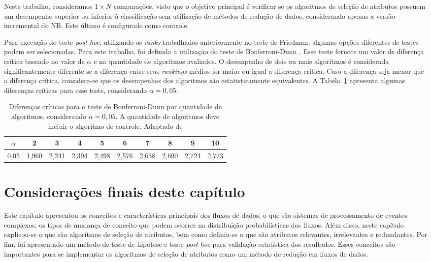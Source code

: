 Neste trabalho, consideramos $ 1 \times N $ comparações, visto que o objetivo principal é verificar se os algoritmos de seleção de atributos possuem um desempenho superior ou inferior à classificação sem utilização de métodos de redução de dados, considerando apenas a versão incremental do NB. Este último é configurado como controle.

Para execução do teste \textit{post-hoc}, utilizando os \textit{ranks} trabalhados anteriormente no teste de Friedman, algumas opções diferentes de testes podem ser selecionadas. Para este trabalho, foi definida a utilização do teste de Bonferroni-Dunn \cite{Demsar2006}. Esse teste fornece um valor de diferença crítica baseado no valor de $\alpha$ e na quantidade de algoritmos avaliados. O desempenho de dois ou mais algoritmos é considerada significantemente diferente se a diferença entre seus \textit{rankings} médios for maior ou igual a diferença crítica. Caso a diferença seja menor que a diferença crítica, considera-se que os desempenhos dos algoritmos são estatisticamente equivalentes. A Tabela~\ref{tab:bonferroni} apresenta algumas diferenças críticas para esse teste, considerando $\alpha = 0,05$.


\begin{table}[!ht]
\centering
\caption[Diferenças críticas para o teste de Bonferroni-Dunn.]{Diferenças críticas para o teste de Bonferroni-Dunn por quantidade de algoritmos, considerando $\alpha = 0,05$. A quantidade de algoritmos deve incluir o algoritmo de controle. Adaptado de }
\label{tab:bonferroni}
\begin{tabular}{cccccccccc}
\hline
$\alpha $& 2 & 3 & 4 & 5 & 6 & 7 & 8 & 9 & 10\\ \hline
0,05 & 1,960 & 2,241 & 2,394 &  2,498 &  2,576 &  2,638 &  2,690 &  2,724  & 2,773 \\ \hline
\end{tabular}
\end{table}

\section{Considerações finais deste capítulo}

Este capítulo apresentou os conceitos e características principais dos fluxos de dados, o que são sistemas de processamento de eventos complexos, os tipos de mudança de conceito que podem ocorrer na distribuição probabilísticas dos fluxos. Além disso, neste capítulo explicou-se o que são algoritmos de seleção de atributos, bem como definiu-se o que são atributos relevantes, irrelevantes e redundantes. Por fim, foi apresentado um método de teste de hipótese e teste \textit{post-hoc} para validação estatística dos resultados. Esses conceitos são importantes para se implementar os algoritmos de seleção de atributos como um método de redução em fluxos de dados.


